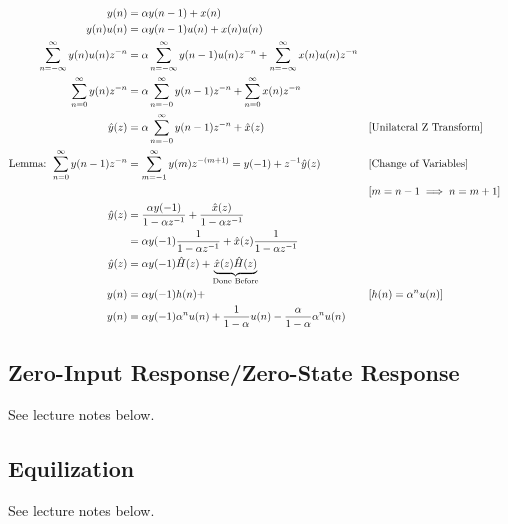 \begin{align*}
    y(n)
    &=
    \alpha y(n-1) + x(n)
    \\
    y(n) u(n)
    &=
    \alpha y(n-1)u(n) + x(n)u(n)
    \\
    \sum_{n=-\infty}^{\infty} y(n) u(n)z^{-n}
    &=
    \alpha \sum_{n=-\infty}^{\infty} y(n-1)u(n)z^{-n} + \sum_{n=-\infty}^{\infty} x(n)u(n)z^{-n}
    \\
    \sum_{n=0}^{\infty} y(n) z^{-n}
    &=
    \alpha \sum_{n=-0}^{\infty} y(n-1)z^{-n} + \sum_{n=0}^{\infty} x(n)z^{-n}
    \\
    \hat{y}(z)
    &=
    \alpha \sum_{n=-0}^{\infty} y(n-1)z^{-n} + \hat{x}(z)
    &&\text{[Unilateral Z Transform]}
    \\
    \text{Lemma: }
    \sum_{n=0}^{\infty} y(n-1) z^{-n}
    &=
    \sum_{m=-1}^{\infty} y(m) z^{-(m+1)}
    = y(-1) + z^{-1} \hat{y}(z)
    &&\text{[Change of Variables]}
    \\
    &
    &&\text{[$m=n-1\implies n=m+1$]}
    \\
    \hat{y}(z) &=\frac{\alpha y(-1)}{1-\alpha z^{-1}}+\frac{\hat{x}(z)}{1-\alpha z^{-1}} \\
    &=\alpha y(-1) \frac{1}{1-\alpha z^{-1}}+\hat{x}(z) \frac{1}{1-\alpha z^{-1}} \\
    \hat{y}(z) &=\alpha y(-1) \hat{H}(z)+\underbrace{\hat{x}(z) \hat{H}(z)}_{\text{Done Before}}
    \\
    y(n)&= \alpha y(-1)h(n)+
    &&\text{[$h(n)=\alpha^{n}u(n)$]}
    \\
    y(n)&= \alpha y(-1)\alpha^{n}u(n)
    + \frac{1}{1-\alpha}u(n) - \frac{\alpha}{1-\alpha}\alpha^n u(n)
\end{align*}

\subsection{Zero-Input Response/Zero-State Response}
See lecture notes below.

\subsection{Equilization}
See lecture notes below.


